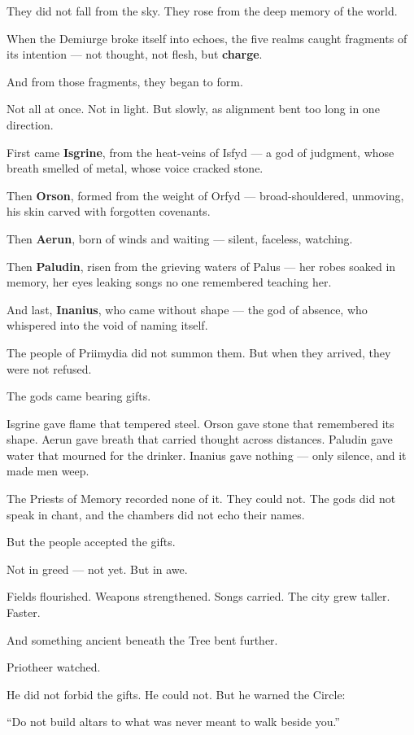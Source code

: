 \documentclass[12pt]{article}
\begin{document}
They did not fall from the sky.  
They rose from the deep memory of the world.

When the Demiurge broke itself into echoes, the five realms caught fragments of its intention —  
not thought, not flesh, but \textbf{charge}.

And from those fragments, they began to form.

Not all at once.  
Not in light.  
But slowly, as alignment bent too long in one direction.

First came \textbf{Isgrine}, from the heat-veins of Isfyd — a god of judgment, whose breath smelled of metal, whose voice cracked stone.  

Then \textbf{Orson}, formed from the weight of Orfyd — broad-shouldered, unmoving, his skin carved with forgotten covenants.  

Then \textbf{Aerun}, born of winds and waiting — silent, faceless, watching.  

Then \textbf{Paludin}, risen from the grieving waters of Palus — her robes soaked in memory, her eyes leaking songs no one remembered teaching her.  

And last, \textbf{Inanius}, who came without shape — the god of absence, who whispered into the void of naming itself.

The people of Priimydia did not summon them.  
But when they arrived, they were not refused.

The gods came bearing gifts.

Isgrine gave flame that tempered steel.  
Orson gave stone that remembered its shape.  
Aerun gave breath that carried thought across distances.  
Paludin gave water that mourned for the drinker.  
Inanius gave nothing — only silence, and it made men weep.

The Priests of Memory recorded none of it.  
They could not.  
The gods did not speak in chant, and the chambers did not echo their names.

But the people accepted the gifts.

Not in greed — not yet.  
But in awe.

Fields flourished.  
Weapons strengthened.  
Songs carried.  
The city grew taller.  
Faster.

And something ancient beneath the Tree bent further.

Priotheer watched.

He did not forbid the gifts.  
He could not.  
But he warned the Circle:

“Do not build altars to what was never meant to walk beside you.”
\end{document}
